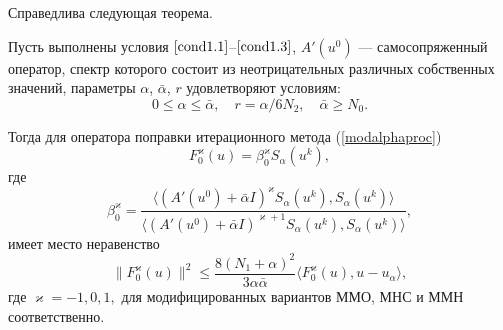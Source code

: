 Справедлива следующая теорема.
\begin{theorem}\label{teomodalpnomonot}
	Пусть выполнены условия $\eqref{cond1.1}$--$\eqref{cond1.3}$,
$A'(u^0)$ --- самосопряженный оператор, спектр которого состоит из неотрицательных различных собственных значений, параметры $\alpha$, $\bar{\alpha}$, $r$ удовлетворяют условиям:
	\begin{equation}\label{cond2.4}
	0\le\alpha\le\bar{\alpha}, \quad r=\alpha/6N_2, \quad \bar{\alpha}\ge N_0.
	\end{equation}
	
	Тогда для оператора поправки итерационного метода (\ref{modalphaproc})
	$$F_0^\varkappa(u)=\beta_0^{\varkappa}S_\alpha(u^k),$$ где 
	$$\beta_0^{\varkappa}=\frac{\langle (A'(u^0)+\bar\alpha I)^{\varkappa}S_\alpha(u^k), S_\alpha(u^k)\rangle}{\langle (A'(u^0)+\bar\alpha I)^{\varkappa+1}S_\alpha(u^k), S_\alpha(u^k)\rangle},$$ имеет место неравенство
	$$\|F_0^\varkappa(u)\|^2\le\frac{8(N_1+\alpha)^2}{3\alpha\bar{\alpha}}\langle F_0^\varkappa(u), u-u_\alpha\rangle,$$
	где $\varkappa=-1, 0, 1,$ для модифицированных вариантов ММО, МНС и ММН соответственно.
\end{theorem} 
